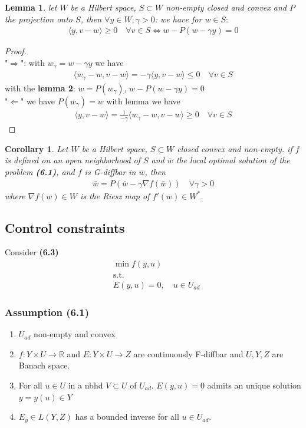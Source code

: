 \documentclass[a4paper,11pt,fleqn]{book}
\newtheorem{corollary}{Corollary}[theorem]
\newtheorem{lemma}[theorem]{Lemma}
\theoremstyle{definition}
\theoremstyle{remark}
\begin{document}
\begin{lemma}
	let $W$ be a Hilbert space, $S \subset W$ non-empty closed and convex and $P$ the projection onto $S$, then $\forall y \in W, \gamma > 0$: we have for $w \in S:$
	\begin{align*}
		\langle y, v - w \rangle \geq 0 \quad \forall v \in S
		\Leftrightarrow w - P(w - \gamma y) = 0
	\end{align*}
\end{lemma}
\begin{proof}\quad\\
	"$\Rightarrow$": with $w_\gamma = w - \gamma y$ we have
	\begin{align*}
		\langle w_\gamma - w, v - w \rangle 
		= -\gamma \langle y, v - w \rangle 
		\le 0 \quad \forall v \in S
	\end{align*}
	with the \textbf{lemma 2}:  $w = P(w_\gamma)$, $ w - P(w - \gamma y) = 0$\\
	"$\Leftarrow$" we have $P(w_\gamma) = w$ with lemma we have
	\begin{align*}
		\langle y, v - w\rangle = \frac{1}{-\gamma}\langle w_\gamma - w, v - w \rangle \geq 0 \quad \forall v \in S
	\end{align*}
\end{proof}

\begin{corollary}
	Let $W$ be a Hilbert space, $S \subset W$ closed convex and non-empty. if $f$ is defined on an open neighborhood of $S$ and $\bar{w}$ the local optimal solution of the problem \textbf{(6.1)}, and $f$ is G-diffbar in $\bar{w}$, then
	\begin{align*}
		\bar{w} = P(\bar{w} - \gamma \nabla f(\bar{w})) \quad \forall \gamma > 0
	\end{align*}
	where $\nabla f(w) \in W$ is the Riesz map of $f'(w) \in W^*$. 
\end{corollary}


\subsection{Control constraints}
Consider \textbf{(6.3)}
\begin{align*}
	& \min f(y, u) \\
	& \text{s.t.}\\
	&  E(y, u) = 0, \quad u \in U_{ad}
\end{align*}

\subsubsection*{Assumption (6.1)}
\begin{enumerate}
	\item $U_{ad}$ non-empty and convex
	\item $f: Y \times U \rightarrow \mathbb{R}$ and $E: Y \times U \rightarrow Z$ are continuously F-diffbar and $U, Y, Z$ are Banach space. 
	\item For all $u \in U$ in a nbhd $V \subset U$ of $U_{ad}$. $E(y, u) = 0$ admits an unique solution $y =y(u) \in Y$
	\item $E_y \in L(Y, Z)$ has a bounded inverse for all $u \in U_{ad}$. 
\end{enumerate}
\end{document}
